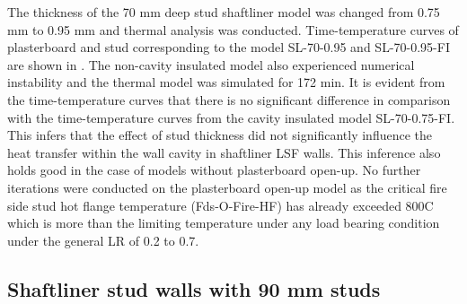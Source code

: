 The thickness of the 70 mm deep stud shaftliner model was changed from 0.75 mm to 0.95 mm and thermal analysis was conducted. Time-temperature curves of plasterboard and stud corresponding to the model SL-70-0.95 and SL-70-0.95-FI are shown in . The non-cavity insulated model also experienced numerical instability and the thermal model was simulated for 172 min. It is evident from the time-temperature curves that there is no significant difference in comparison with the time-temperature curves from the cavity insulated model SL-70-0.75-FI. This infers that the effect of stud thickness did not significantly influence the heat transfer within the wall cavity in shaftliner LSF walls. This inference also holds good in the case of models without plasterboard open-up. No further iterations were conducted on the plasterboard open-up model as the critical fire side stud hot flange temperature (Fds-O-Fire-HF) has already exceeded 800\degree C which is more than the limiting temperature under any load bearing condition under the general LR of 0.2 to 0.7. 

\subsection{Shaftliner stud walls with 90 mm studs}

